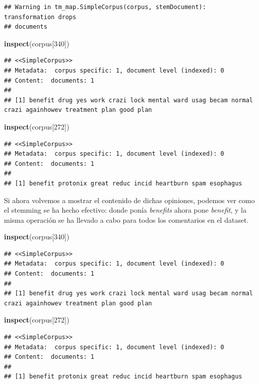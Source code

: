 \documentclass[spanish,]{article}
\newenvironment{Shaded}{\begin{snugshade}}{\end{snugshade}}
\newcommand{\KeywordTok}[1]{\textcolor[rgb]{0.13,0.29,0.53}{\textbf{#1}}}
\newcommand{\DecValTok}[1]{\textcolor[rgb]{0.00,0.00,0.81}{#1}}
\newcommand{\NormalTok}[1]{#1}
\begin{document}
\begin{verbatim}
## Warning in tm_map.SimpleCorpus(corpus, stemDocument): transformation drops
## documents
\end{verbatim}

\begin{Shaded}
\begin{Highlighting}[]
\KeywordTok{inspect}\NormalTok{(corpus[}\DecValTok{340}\NormalTok{])}
\end{Highlighting}
\end{Shaded}

\begin{verbatim}
## <<SimpleCorpus>>
## Metadata:  corpus specific: 1, document level (indexed): 0
## Content:  documents: 1
## 
## [1] benefit drug yes work crazi lock mental ward usag becam normal crazi againhowev treatment plan good plan
\end{verbatim}

\begin{Shaded}
\begin{Highlighting}[]
\KeywordTok{inspect}\NormalTok{(corpus[}\DecValTok{272}\NormalTok{])}
\end{Highlighting}
\end{Shaded}

\begin{verbatim}
## <<SimpleCorpus>>
## Metadata:  corpus specific: 1, document level (indexed): 0
## Content:  documents: 1
## 
## [1] benefit protonix great reduc incid heartburn spam esophagus
\end{verbatim}

Si ahora volvemos a mostrar el contenido de dichas opiniones, podemos
ver como el stemming se ha hecho efectivo: donde ponía \textit{benefits}
ahora pone \textit{benefit}, y la misma operación se ha llevado a cabo
para todos los comentarios en el dataset.

\begin{Shaded}
\begin{Highlighting}[]
\KeywordTok{inspect}\NormalTok{(corpus[}\DecValTok{340}\NormalTok{])}
\end{Highlighting}
\end{Shaded}

\begin{verbatim}
## <<SimpleCorpus>>
## Metadata:  corpus specific: 1, document level (indexed): 0
## Content:  documents: 1
## 
## [1] benefit drug yes work crazi lock mental ward usag becam normal crazi againhowev treatment plan good plan
\end{verbatim}

\begin{Shaded}
\begin{Highlighting}[]
\KeywordTok{inspect}\NormalTok{(corpus[}\DecValTok{272}\NormalTok{])}
\end{Highlighting}
\end{Shaded}

\begin{verbatim}
## <<SimpleCorpus>>
## Metadata:  corpus specific: 1, document level (indexed): 0
## Content:  documents: 1
## 
## [1] benefit protonix great reduc incid heartburn spam esophagus
\end{verbatim}
\end{document}
